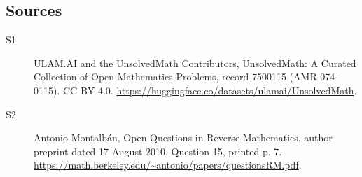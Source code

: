 \documentclass[11pt]{article}
\begin{document}
\subsection{Sources}
\begin{description}
\item[\hypertarget{source:7500115:1}{S1}] ULAM.AI and the UnsolvedMath Contributors, UnsolvedMath: A Curated Collection of Open Mathematics Problems, record 7500115 (AMR-074-0115). CC BY 4.0. \url{https://huggingface.co/datasets/ulamai/UnsolvedMath}.
\item[\hypertarget{source:7500115:2}{S2}] Antonio Montalbán, Open Questions in Reverse Mathematics, author preprint dated 17 August 2010, Question 15, printed p. 7. \url{https://math.berkeley.edu/~antonio/papers/questionsRM.pdf}.
\end{description}
\label{end:7500115}
\end{document}
